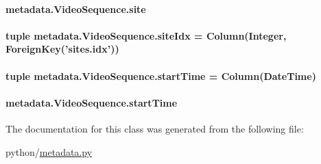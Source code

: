 \hypertarget{classmetadata_1_1VideoSequence_a98595e8d2787337d0cad573957be5601}{
\paragraph[{site}]{\setlength{\rightskip}{0pt plus 5cm}metadata.\-Video\-Sequence.\-site}}\label{classmetadata_1_1VideoSequence_a98595e8d2787337d0cad573957be5601}
\hypertarget{classmetadata_1_1VideoSequence_acb8442e0489a76a70519fc2b765237fc}{
\paragraph[{site\-Idx}]{\setlength{\rightskip}{0pt plus 5cm}tuple metadata.\-Video\-Sequence.\-site\-Idx = Column(Integer, Foreign\-Key('sites.\-idx'))\hspace{0.3cm}{\ttfamily [static]}}}\label{classmetadata_1_1VideoSequence_acb8442e0489a76a70519fc2b765237fc}
\hypertarget{classmetadata_1_1VideoSequence_a3ba5bdc6a67b7f7e76ce019107de464d}{
\paragraph[{start\-Time}]{\setlength{\rightskip}{0pt plus 5cm}tuple metadata.\-Video\-Sequence.\-start\-Time = Column(Date\-Time)\hspace{0.3cm}{\ttfamily [static]}}}\label{classmetadata_1_1VideoSequence_a3ba5bdc6a67b7f7e76ce019107de464d}
\hypertarget{classmetadata_1_1VideoSequence_a7941063c98022fb6ed9d7e71227aa8ce}{
\paragraph[{start\-Time}]{\setlength{\rightskip}{0pt plus 5cm}metadata.\-Video\-Sequence.\-start\-Time}}\label{classmetadata_1_1VideoSequence_a7941063c98022fb6ed9d7e71227aa8ce}


The documentation for this class was generated from the following file\-:\begin{DoxyCompactItemize}
\item 
python/\hyperlink{metadata_8py}{metadata.\-py}\end{DoxyCompactItemize}
